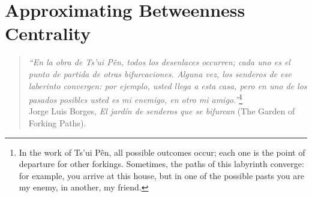 \chapter[Approximating Betweenness Centrality]{Approximating Betweenness Centrality\protect{}}\label{ch:centrsampl}

\begin{quote}
  \begin{flushright}
    {\em ``En la obra de Ts'ui Pên, todos los desenlaces occurren; cada uno es
    el punto de partida de otras bifurcaciones. Alguna vez, los senderos de ese
    laberinto convergen: por ejemplo, usted llega a esta casa, pero en uno de los
    pasados posibles usted es mi enemigo, en otro mi amigo.''}\footnote{In the
    work of Ts'ui Pên, all possible outcomes occur; each one is the point of
    departure for other forkings. Sometimes, the paths of this labyrinth
    converge: for example, you arrive at this house, but in one of the possible
    pasts you are my enemy, in another, my friend.}\\Jorge Luis Borges, {\em El
    jardín de senderos
que se bifurcan} (The Garden of Forking Paths).
\end{flushright}
\end{quote}










